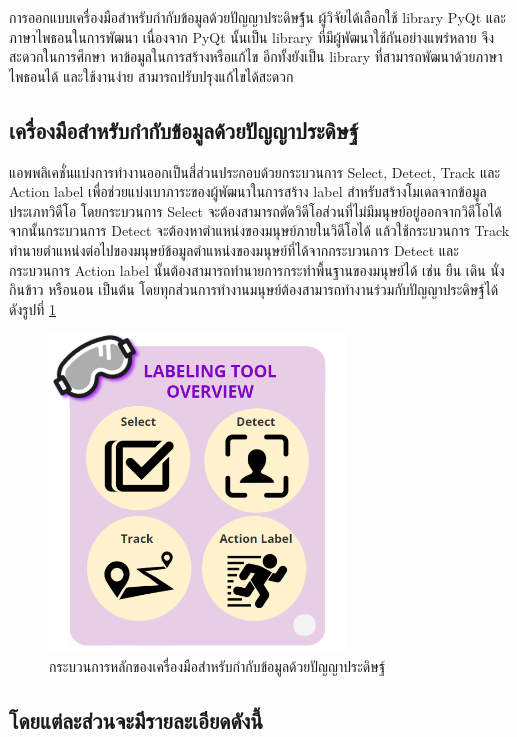 การออกแบบเครื่องมือสำหรับกำกับข้อมูลด้วยปัญญาประดิษฐ์้น ผู้วิจัยได้เลือกใช้ library PyQt และภาษาไพธอนในการพัฒนา
เนื่องจาก PyQt นั้นเป็น library ที่มีผู้พัฒนาใช้กันอย่างแพร่หลาย จึงสะดวกในการศึกษา หาข้อมูลในการสร้างหรือแก้ไข
อีกทั้งยังเป็น library ที่สามารถพัฒนาด้วยภาษาไพธอนได้ และใช้งานง่าย สามารถปรับปรุงแก้ไขได้สะดวก

\subsection{เครื่องมือสำหรับกำกับข้อมูลด้วยปัญญาประดิษฐ์}
แอพพลิเคชั่นแบ่งการทำงานออกเป็นสี่ส่วนประกอบด้วยกระบวนการ Select, Detect, Track และ Action label
เพื่อช่วยแบ่งเบาภาระของผู้พัฒนาในการสร้าง label สำหรับสร้างโมเดลจากข้อมูลประเภทวิดีโอ โดยกระบวนการ Select
จะต้องสามารถตัดวิดีโอส่วนที่ไม่มีมนุษย์อยู่ออกจากวิดีโอได้ จากนั้นกระบวนการ Detect จะต้องหาตำแหน่งของมนุษย์ภายในวิดีโอได้
แล้วใช้กระบวนการ Track ทำนายตำแหน่งต่อไปของมนุษย์ข้อมูลตำแหน่งของมนุษย์ที่ได้จากกระบวนการ Detect
และกระบวนการ Action label นั้นต้องสามารถทำนายการกระทำพื้นฐานของมนุษย์ได้ เช่น ยืน เดิน นั่ง กินข้าว หรือนอน เป็นต้น 
โดยทุกส่วนการทำงานมนุษย์ต้องสามารถทำงานร่วมกับปัญญาประดิษฐ์ได้
ดังรูปที่ \ref{fig:labeling_overview}

\begin{figure}[!ht]
    \centering
    \includegraphics[width=0.7\textwidth]{chapter3/images/3_6/labelingToolOverview.png}
    \caption{กระบวนการหลักของเครื่องมือสำหรับกำกับข้อมูลด้วยปัญญาประดิษฐ์}
    \label{fig:labeling_overview}
\end{figure}
\clearpage

\subsection*{โดยแต่ละส่วนจะมีรายละเอียดดังนี้}
